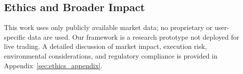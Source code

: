 \subsection{Ethics and Broader Impact}

This work uses only publicly available market data; no proprietary or user-specific data are used. Our framework is a research prototype not deployed for live trading. A detailed discussion of market impact, execution risk, environmental considerations, and regulatory compliance is provided in Appendix~\ref{sec:ethics_appendix}.
